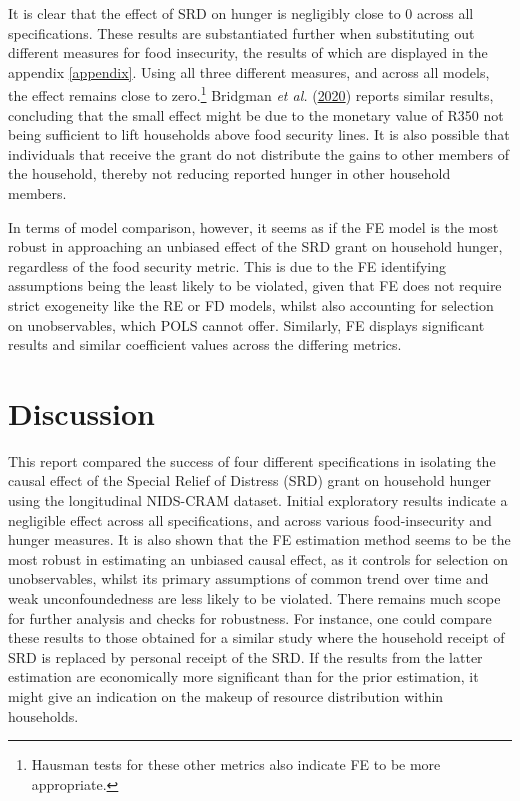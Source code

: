 \documentclass[11pt,preprint, authoryear]{elsarticle}
\numberwithin{equation}{section}
\numberwithin{figure}{section}
\numberwithin{table}{section}
\let\rmarkdownfootnote\footnote%
\def\footnote{\protect\rmarkdownfootnote}
\begin{document}
It is clear that the effect of SRD on hunger is negligibly close to 0
across all specifications. These results are substantiated further when
substituting out different measures for food insecurity, the results of
which are displayed in the appendix \ref{appendix}. Using all three
different measures, and across all models, the effect remains close to
zero.\footnote{Hausman tests for these other metrics also indicate FE to
  be more appropriate.} Bridgman \emph{et al.}
(\protect\hyperlink{ref-bridgman2020hunger}{2020}) reports similar
results, concluding that the small effect might be due to the monetary
value of R350 not being sufficient to lift households above food
security lines. It is also possible that individuals that receive the
grant do not distribute the gains to other members of the household,
thereby not reducing reported hunger in other household members.

In terms of model comparison, however, it seems as if the FE model is
the most robust in approaching an unbiased effect of the SRD grant on
household hunger, regardless of the food security metric. This is due to
the FE identifying assumptions being the least likely to be violated,
given that FE does not require strict exogeneity like the RE or FD
models, whilst also accounting for selection on unobservables, which
POLS cannot offer. Similarly, FE displays significant results and
similar coefficient values across the differing metrics.

\hypertarget{discussion}{%
\section{\texorpdfstring{Discussion
\label{Discussion}}{Discussion }}\label{discussion}}

This report compared the success of four different specifications in
isolating the causal effect of the Special Relief of Distress (SRD)
grant on household hunger using the longitudinal NIDS-CRAM dataset.
Initial exploratory results indicate a negligible effect across all
specifications, and across various food-insecurity and hunger measures.
It is also shown that the FE estimation method seems to be the most
robust in estimating an unbiased causal effect, as it controls for
selection on unobservables, whilst its primary assumptions of common
trend over time and weak unconfoundedness are less likely to be
violated. There remains much scope for further analysis and checks for
robustness. For instance, one could compare these results to those
obtained for a similar study where the household receipt of SRD is
replaced by personal receipt of the SRD. If the results from the latter
estimation are economically more significant than for the prior
estimation, it might give an indication on the makeup of resource
distribution within households.
\end{document}
